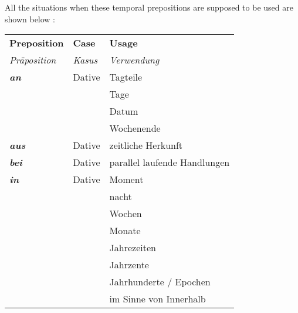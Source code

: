 \documentclass[a4paper,twocolumn,10pt]{article}
\newcommand{\tabularxtable}[3]
{

	\vspace{0.5cm}
	\nolinenumbers

	\begin{tabularx}{#1}{#2}
		#3
	\end{tabularx}

	\linenumbers
	\vspace{0.5cm}
}
\begin{document}

All the situations when these temporal prepositions are supposed to be used are shown below :



\tabularxtable
{0.95\linewidth}
{llX}
{

\rowcolor{table-topic}
\textbf{Preposition} & \textbf{Case} & \textbf{Usage}\\


\rowcolor{table-topic}
{\textit{Präposition}} &
{\textit{Kasus}} &
{\textit{Verwendung}}\\

\midrule

\rowcolor{table-alternating-white} \textbf{\textit{an}}        & Dative     & Tagteile\\
\rowcolor{table-alternating-white}                             &            & Tage\\
\rowcolor{table-alternating-white}                             &            & Datum\\
\rowcolor{table-alternating-white}                             &            & Wochenende\\
\rowcolor{table-alternating-white} \textbf{\textit{aus}}       & Dative     & zeitliche Herkunft\\
\rowcolor{table-alternating-white} \textbf{\textit{bei}}       & Dative     & parallel laufende Handlungen\\
\rowcolor{table-alternating-white} \textbf{\textit{in}}        & Dative     & Moment\\
\rowcolor{table-alternating-white}                             &            & nacht\\
\rowcolor{table-alternating-white}                             &            & Wochen\\
\rowcolor{table-alternating-white}                             &            & Monate\\
\rowcolor{table-alternating-white}                             &            & Jahrezeiten\\
\rowcolor{table-alternating-white}                             &            & Jahrzente\\
\rowcolor{table-alternating-white}                             &            & Jahrhunderte / Epochen\\
\rowcolor{table-alternating-white}                             &            & im Sinne von Innerhalb\\
}
\end{document}
